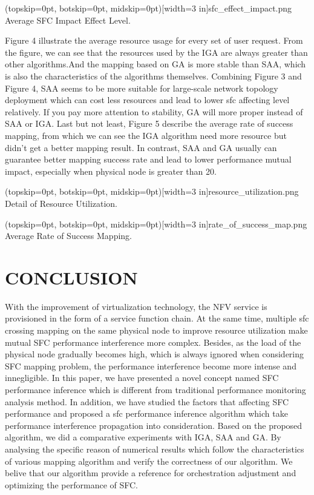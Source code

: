 \documentclass{ieeeaccess}
\begin{document}
\Figure[t!](topskip=0pt, botskip=0pt, midskip=0pt)[width=3 in]{sfc_effect_impact.png}
{ Average SFC Impact Effect Level.\label{fig3}}

Figure 4 illustrate the average resource usage for every set of user request. From the figure, we can see that the resources used by the IGA are always greater than other algorithms.And the mapping based on GA is more stable than SAA, which is also the characteristics of the algorithms themselves. Combining Figure 3 and Figure 4, SAA seems to be more suitable for large-scale network topology deployment which can cost less resources and lead to lower sfc affecting level relatively. If you pay more attention to stability, GA will more proper instead of SAA or IGA. Last but not least, Figure 5 describe the average rate of success mapping, from which we can see the IGA algorithm need more resource but didn't get a better mapping result. In contrast, SAA and GA usually can guarantee better mapping success rate and lead to lower performance mutual impact, especially when physical node is greater than 20.


\Figure[t!](topskip=0pt, botskip=0pt, midskip=0pt)[width=3 in]{resource_utilization.png}
{ Detail of Resource Utilization.\label{fig4}}


\Figure[t!](topskip=0pt, botskip=0pt, midskip=0pt)[width=3 in]{rate_of_success_map.png}
{ Average Rate of Success Mapping.\label{fig5}}

\section{CONCLUSION}
 With the improvement of virtualization technology, the NFV service is provisioned in the form of a service function chain. At the same time, multiple sfc crossing mapping on the same physical node to improve resource utilization make mutual SFC performance interference more complex. Besides, as the load of the physical node gradually becomes high, which is always ignored when considering SFC mapping problem, the performance interference become more intense and innegligible. In this paper, we have presented a novel concept named SFC performance inference which is different from traditional performance monitoring analysis method. In addition, we have studied the factors that affecting SFC performance and proposed a sfc performance inference algorithm which take performance interference propagation into consideration. Based on the proposed algorithm, we did a comparative experiments with IGA, SAA and GA. By analysing the specific reason of numerical results which follow the characteristics of various mapping algorithm and verify the correctness of our algorithm. We belive that our algorithm provide a reference for orchestration adjustment and optimizing the performance of SFC.
\end{document}
